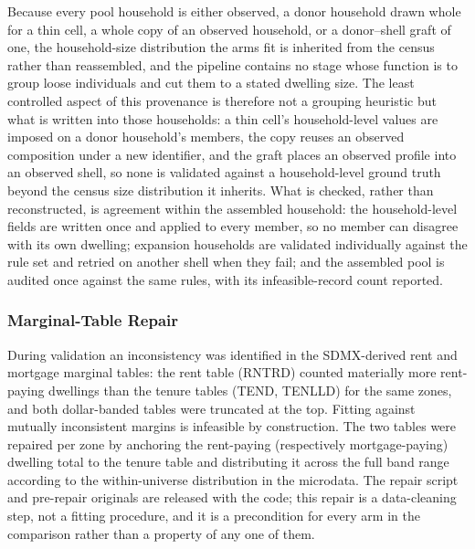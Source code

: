 \documentclass[review]{elsarticle}
\begin{document}
Because every pool household is either observed, a donor household drawn whole
for a thin cell, a whole copy of an observed household, or a donor--shell graft of
one, the household-size distribution the arms fit is inherited from the census
rather than reassembled, and the pipeline contains no stage whose function is to
group loose individuals and cut them to a stated dwelling size. The least
controlled aspect of this provenance is therefore not a grouping heuristic but
what is written into those households: a thin cell's household-level values are
imposed on a donor household's members, the copy reuses an observed composition
under a new identifier, and the graft places an observed profile into an observed
shell, so none is validated against a household-level ground truth beyond the
census size distribution it inherits. What is checked, rather than reconstructed, is agreement within the assembled
household: the household-level fields are written once and applied to every
member, so no member can disagree with its own dwelling; expansion households
are validated individually against the rule set and retried on another shell
when they fail; and the assembled pool is audited once against the same rules,
with its infeasible-record count reported.


\FloatBarrier

\subsubsection{Marginal-Table Repair}
\label{sec:pool_rebalance}
During validation an inconsistency was identified in the SDMX-derived rent and mortgage marginal tables: the rent table (RNTRD) counted materially more rent-paying dwellings than the tenure tables (TEND, TENLLD) for the same zones, and both dollar-banded tables were truncated at the top. Fitting against mutually inconsistent margins is infeasible by construction. The two tables were repaired per zone by anchoring the rent-paying (respectively mortgage-paying) dwelling total to the tenure table and distributing it across the full band range according to the within-universe distribution in the microdata. The repair script and pre-repair originals are released with the code; this repair is a data-cleaning step, not a fitting procedure, and it is a precondition for every arm in the comparison rather than a property of any one of them.

\FloatBarrier
\end{document}
